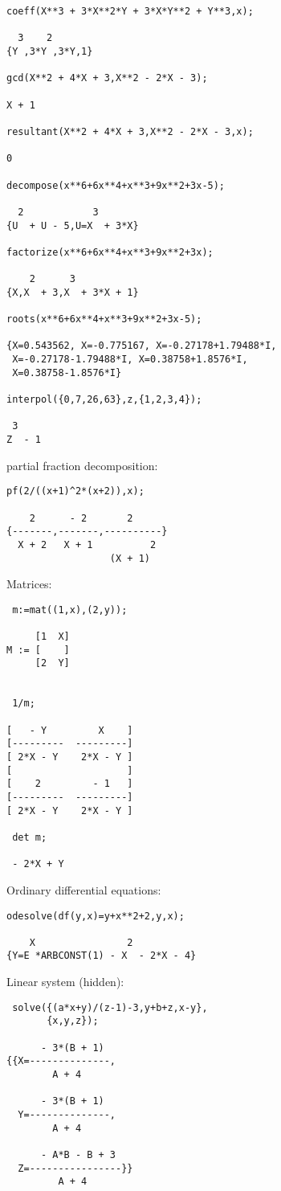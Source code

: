 \begin{verbatim}
coeff(X**3 + 3*X**2*Y + 3*X*Y**2 + Y**3,x);

  3    2
{Y ,3*Y ,3*Y,1}

gcd(X**2 + 4*X + 3,X**2 - 2*X - 3);

X + 1

resultant(X**2 + 4*X + 3,X**2 - 2*X - 3,x);

0

decompose(x**6+6x**4+x**3+9x**2+3x-5);

  2            3
{U  + U - 5,U=X  + 3*X}

factorize(x**6+6x**4+x**3+9x**2+3x);

    2      3
{X,X  + 3,X  + 3*X + 1}
 
roots(x**6+6x**4+x**3+9x**2+3x-5);

{X=0.543562, X=-0.775167, X=-0.27178+1.79488*I,
 X=-0.27178-1.79488*I, X=0.38758+1.8576*I,
 X=0.38758-1.8576*I}

interpol({0,7,26,63},z,{1,2,3,4});
 
 3
Z  - 1

\end{verbatim}
partial fraction decomposition:
\begin{verbatim}
pf(2/((x+1)^2*(x+2)),x); 

    2      - 2       2
{-------,-------,----------}
  X + 2   X + 1          2
                  (X + 1)

\end{verbatim}
Matrices:
\begin{verbatim} 
 m:=mat((1,x),(2,y));

     [1  X]
M := [    ]
     [2  Y]


 1/m;

[   - Y         X    ]
[---------  ---------]
[ 2*X - Y    2*X - Y ]
[                    ]
[    2         - 1   ]
[---------  ---------]
[ 2*X - Y    2*X - Y ]

 det m;

 - 2*X + Y

\end{verbatim} 
Ordinary differential equations:
\begin{verbatim} 
odesolve(df(y,x)=y+x**2+2,y,x);

    X                2
{Y=E *ARBCONST(1) - X  - 2*X - 4}

\end{verbatim}
Linear system (hidden):
\begin{verbatim}
 solve({(a*x+y)/(z-1)-3,y+b+z,x-y},
       {x,y,z});

      - 3*(B + 1)
{{X=--------------,
        A + 4

      - 3*(B + 1)
  Y=--------------,
        A + 4

      - A*B - B + 3
  Z=----------------}}
         A + 4

\end{verbatim}
